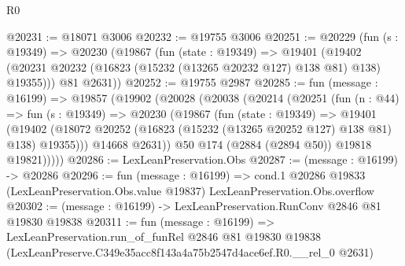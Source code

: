 \begin{lexlean}{R0}
\begin{coremodule}
@20231 := @18071 @3006
@20232 := @19755 @3006
@20251 := @20229
    (fun (s : @19349) =>
    @20230
      (@19867
        (fun (state : @19349) =>
        @19401 (@19402 (@20231 @20232 (@16823 (@15232 (@13265 @20232 @127) @138 @81) @138) @19355)))
        @81
        @2631))
@20252 := @19755 @2987
@20285 := fun (message : @16199) =>
  @19857
    (@19902
      (@20028
        (@20038
          (@20214
            (@20251
              (fun (n : @44) =>
              fun (s : @19349) =>
              @20230
                (@19867
                  (fun (state : @19349) =>
                  @19401
                    (@19402
                      (@18072 @20252 (@16823 (@15232 (@13265 @20252 @127) @138 @81) @138) @19355)))
                  @14668
                  @2631))
              @50
              @174
              (@2884 (@2894 @50))
              @19818
              @19821)))))
@20286 := LexLeanPreservation.Obs
@20287 := (message : @16199) -> @20286
@20296 := fun (message : @16199) =>
  cond.{1} @20286 @19833 (LexLeanPreservation.Obs.value @19837) LexLeanPreservation.Obs.overflow
@20302 := (message : @16199) -> LexLeanPreservation.RunConv @2846 @81 @19830 @19838
@20311 := fun (message : @16199) =>
  LexLeanPreservation.run_of_funRel
    @2846
    @81
    @19830
    @19838
    (LexLeanPreserve.C349e35acc8f143a4a75b2547d4ace6ef.R0.__rel_0 @2631)
\end{coremodule}
\end{lexlean}

